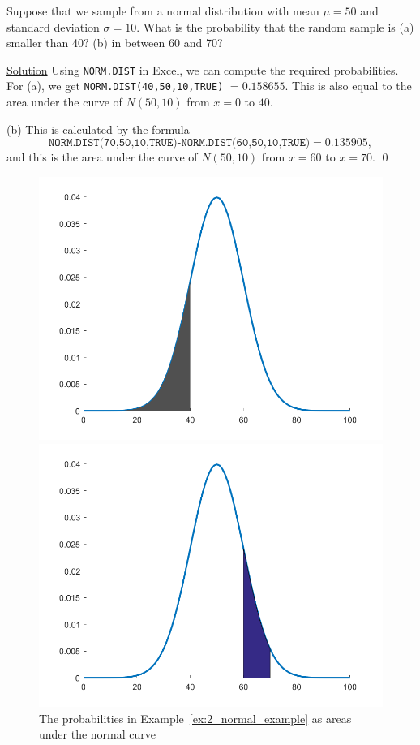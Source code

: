 \begin{myexample}\label{ex:2_normal_example}
Suppose that we sample from a normal distribution with mean $\mu = 50$ and standard deviation $\sigma = 10$. What is the probability that the random sample is (a) smaller than 40? (b) in between 60 and 70?

\underline{Solution}
Using \texttt{NORM.DIST} in Excel, we can compute the required probabilities.
For (a), we get \texttt{NORM.DIST(40,50,10,TRUE)} $ = 0.158655$.
This is also equal to the area under the curve of $N(50,10)$ from $x = 0$ to $40$.

(b) This is calculated by the formula $$\texttt{NORM.DIST(70,50,10,TRUE)-NORM.DIST(60,50,10,TRUE)} = 0.135905,$$ and this is the area under the curve of $N(50,10)$ from $x = 60$ to $x = 70$. \qed
\end{myexample}

\begin{figure}[htbp]
 \begin{minipage}{.5\textwidth}
        \centering
	\includegraphics[width=0.9\linewidth]{fig/2_normal_example_a}
    \end{minipage}
    \begin{minipage}{0.5\textwidth}
        \centering
	\includegraphics[width=0.9\linewidth]{fig/2_normal_example_b}
    \end{minipage}	
    \caption{The probabilities in Example~\ref{ex:2_normal_example} as areas under the normal curve \label{fig:2_normal_example}}
\end{figure}


